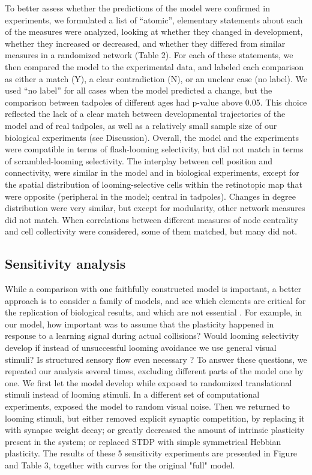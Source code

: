 \documentclass{article}
\begin{document}
To better assess whether the predictions of the model were confirmed in experiments, we formulated a list of “atomic”, elementary statements about each of the measures were analyzed, looking at whether they changed in development, whether they increased or decreased, and whether they differed from similar measures in a randomized network (Table 2). For each of these statements, we then compared the model to the experimental data, and labeled each comparison as either a match (Y), a clear contradiction (N), or an unclear case (no label). We used “no label” for all cases when the model predicted a change, but the comparison between tadpoles of different ages had p-value above 0.05. This choice reflected the lack of a clear match between developmental trajectories of the model and of real tadpoles, as well as a relatively small sample size of our biological experiments (see Discussion). Overall, the model and the experiments were compatible in terms of flash-looming selectivity, but did not match in terms of scrambled-looming selectivity. The interplay between cell position and connectivity, were similar in the model and in biological experiments, except for the spatial distribution of looming-selective cells within the retinotopic map that were opposite (peripheral in the model; central in tadpoles). Changes in degree distribution were very similar, but except for modularity, other network measures did not match. When correlations between different measures of node centrality and cell collectivity were considered, some of them matched, but many did not.

\subsection*{Sensitivity analysis}

While a comparison with one faithfully constructed model is important, a better approach is to consider a family of models, and see which elements are critical for the replication of biological results, and which are not essential \citep{linderman2017constrain,pauli2018repro}. For example, in our model, how important was to assume that the plasticity happened in response to a learning signal during actual collisions? Would  looming selectivity develop if instead of unsuccessful looming avoidance we use general visual stimuli? Is structured sensory flow even necessary \citep{triplett2018emergence}? To answer these questions, we repeated our analysis several times, excluding different parts of the model one by one. We first let the model develop while exposed to randomized translational stimuli instead of looming stimuli. In a different set of computational experiments, exposed the model to random visual noise. Then we returned to looming stimuli, but either removed explicit synaptic competition, by replacing it with synapse weight decay; or greatly decreased the amount of intrinsic plasticity present in the system; or replaced STDP with simple symmetrical Hebbian plasticity. The results of these 5 sensitivity experiments are presented in Figure and Table 3, together with curves for the original "full" model.
\end{document}
